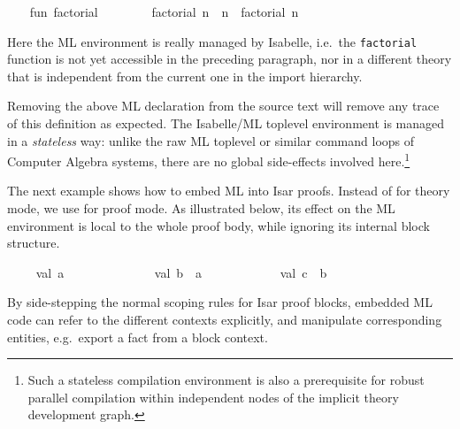 \begin{isabellebody}
%
\isadelimML
%
\endisadelimML
%
\isatagML
{}\isamarkupfalse%
\ {\isacharverbatimopen}\isanewline
\ \ fun\ factorial\ {}\ {\isacharequal}\ {}\isanewline
\ \ \ \ {\isacharbar}\ factorial\ n\ {\isacharequal}\ n\ {\isacharasterisk}\ factorial\ {\isacharparenleft}n\ {\isacharminus}\ {}{\isacharparenright}\isanewline
{\isacharverbatimclose}%
\endisatagML
{\isafoldML}%
%
\isadelimML
%
\endisadelimML
%
\begin{isamarkuptext}%
Here the ML environment is really managed by Isabelle, i.e.\
  the \verb|factorial| function is not yet accessible in the preceding
  paragraph, nor in a different theory that is independent from the
  current one in the import hierarchy.

  Removing the above ML declaration from the source text will remove
  any trace of this definition as expected.  The Isabelle/ML toplevel
  environment is managed in a \emph{stateless} way: unlike the raw ML
  toplevel or similar command loops of Computer Algebra systems, there
  are no global side-effects involved here.\footnote{Such a stateless
  compilation environment is also a prerequisite for robust parallel
  compilation within independent nodes of the implicit theory
  development graph.}

  \medskip The next example shows how to embed ML into Isar proofs.
  Instead of \indexref{}{command}{ML}\hyperlink{command.ML}{\mbox{}} for theory mode, we use \hyperlink{command.ML-prf}{\mbox{}} for proof mode.  As illustrated below, its effect on the
  ML environment is local to the whole proof body, while ignoring its
  internal block structure.%
\end{isamarkuptext}%
\isamarkuptrue%
\isamarkupfalse%
\isanewline
%
\isadelimML
\ \ %
\endisadelimML
%
\isatagML
{}\isamarkupfalse%
\ {\isacharverbatimopen}\ val\ a\ {\isacharequal}\ {}\ {\isacharverbatimclose}\isanewline
\ \ \isacommand{{\isacharbraceleft}}\isamarkupfalse%
\ %
\isanewline
\ \ \ \ \isamarkupfalse%
\ {\isacharverbatimopen}\ val\ b\ {\isacharequal}\ a\ {\isacharplus}\ {}\ {\isacharverbatimclose}\isanewline
\ \ \isacommand{{\isacharbraceright}}\isamarkupfalse%
\ %
\isanewline
\ \ \isamarkupfalse%
\ {\isacharverbatimopen}\ val\ c\ {\isacharequal}\ b\ {\isacharplus}\ {}\ {\isacharverbatimclose}\isanewline
\isacommand{qed}\isamarkupfalse%
%
\endisatagML
{\isafoldML}%
%
\isadelimML
%
\endisadelimML
%
\begin{isamarkuptext}%
By side-stepping the normal scoping rules for Isar proof
  blocks, embedded ML code can refer to the different contexts
  explicitly, and manipulate corresponding entities, e.g.\ export a
  fact from a block context.


\end{isamarkuptext}
\end{isabellebody}
